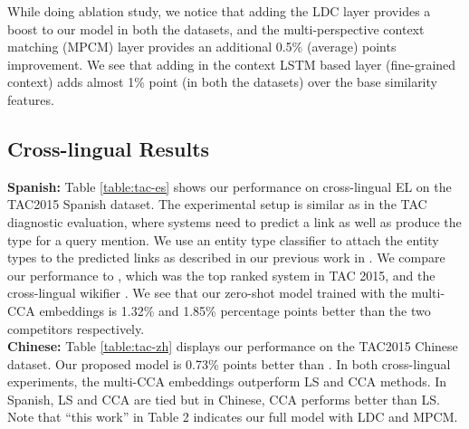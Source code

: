 \documentclass[letterpaper]{article} \usepackage{aaai18}  \usepackage{times}  \usepackage{helvet}  \usepackage{courier}  \usepackage{url}  \usepackage{graphicx}  \frenchspacing  \setlength{\pdfpagewidth}{8.5in}  \setlength{\pdfpageheight}{11in}  \usepackage{latexsym}
\begin{document}
While doing ablation study, we notice that adding the LDC layer provides a boost to our model in both the datasets, and the multi-perspective context matching (MPCM) layer provides an additional  0.5\% (average) points improvement. We see that adding in the context LSTM based layer (fine-grained context) adds almost 1\% point (in both the datasets) over the base similarity features.

\subsection{Cross-lingual Results}
\textbf{Spanish:} Table \ref{table:tac-es} shows our performance on cross-lingual EL on the TAC2015 Spanish dataset. The experimental setup is similar as in the TAC diagnostic evaluation, where systems need to predict a link as well as produce the type for a query mention. We use an entity type classifier to attach the entity types to the predicted links as described in our previous work in \cite{sil2015ibm}. We compare our performance to \cite{sil2016one}, which was the top ranked system in TAC 2015, and the cross-lingual wikifier \cite{tsai2016cross}. We see that our zero-shot model trained with the multi-CCA embeddings is 1.32\% and 1.85\% percentage points better than the two competitors respectively.\\
\textbf{Chinese:} Table \ref{table:tac-zh} displays our performance on the TAC2015 Chinese dataset. 
Our proposed model is 0.73\% points better than \cite{tsai2016cross}. In both cross-lingual experiments, the multi-CCA embeddings outperform LS and CCA methods. In Spanish, LS and CCA are tied but in Chinese, CCA performs better than LS. Note that ``this work'' in Table 2 indicates our full model with LDC and MPCM.
\end{document}
